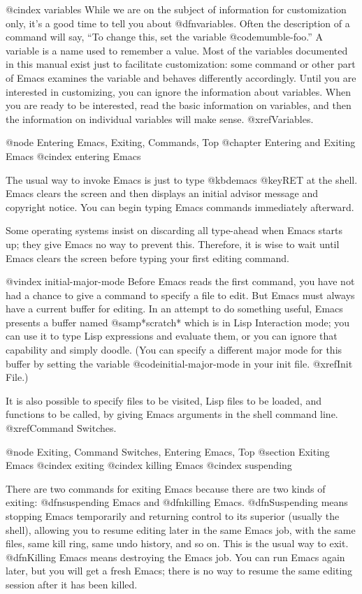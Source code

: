 {{@cindex variables
  While we are on the subject of information for customization only, it's a
good time to tell you about @dfn{variables}.  Often the description of a
command will say, ``To change this, set the variable @code{mumble-foo}.''
A variable is a name used to remember a value.  Most of the variables
documented in this manual exist just to facilitate customization: some
command or other part of Emacs examines the variable and behaves
differently accordingly.  Until you are interested in customizing, you can
ignore the information about variables.  When you are ready to be
interested, read the basic information on variables, and then the
information on individual variables will make sense.  @xref{Variables}.

@node Entering Emacs, Exiting, Commands, Top
@chapter Entering and Exiting Emacs
@cindex entering Emacs

  The usual way to invoke Emacs is just to type @kbd{emacs @key{RET}} at
the shell.  Emacs clears the screen and then displays an initial advisor
message and copyright notice.  You can begin typing Emacs commands
immediately afterward.

  Some operating systems insist on discarding all type-ahead when Emacs
starts up; they give Emacs no way to prevent this.  Therefore, it is
wise to wait until Emacs clears the screen before typing your first
editing command.

@vindex initial-major-mode
  Before Emacs reads the first command, you have not had a chance to give a
command to specify a file to edit.  But Emacs must always have a current
buffer for editing.  In an attempt to do something useful, Emacs presents a
buffer named @samp{*scratch*} which is in Lisp Interaction mode; you can
use it to type Lisp expressions and evaluate them, or you can ignore that
capability and simply doodle.  (You can specify a different major mode for
this buffer by setting the variable @code{initial-major-mode} in your init
file.  @xref{Init File}.)

  It is also possible to specify files to be visited, Lisp files to be
loaded, and functions to be called, by giving Emacs arguments in the
shell command line.  @xref{Command Switches}.

@node Exiting, Command Switches, Entering Emacs, Top
@section Exiting Emacs
@cindex exiting
@cindex killing Emacs
@cindex suspending

  There are two commands for exiting Emacs because there are two kinds of
exiting: @dfn{suspending} Emacs and @dfn{killing} Emacs.  @dfn{Suspending} means
stopping Emacs temporarily and returning control to its superior (usually
the shell), allowing you to resume editing later in the same Emacs job,
with the same files, same kill ring, same undo history, and so on.  This is
the usual way to exit.  @dfn{Killing} Emacs means destroying the Emacs job.
You can run Emacs again later, but you will get a fresh Emacs; there is no
way to resume the same editing session after it has been killed.

}}
